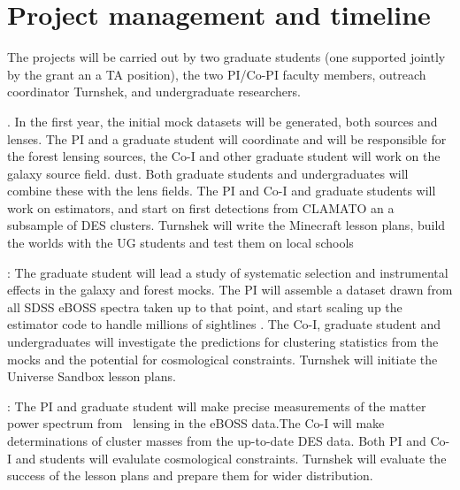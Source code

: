 \section{Project management and timeline}
The projects will be carried out by two graduate students (one
supported jointly by the grant an a TA position), 
the two PI/Co-PI faculty
members, outreach coordinator Turnshek, and undergraduate researchers.

.  In the first year, the initial mock
datasets will be generated, both sources and lenses.
The PI and a graduate student
will coordinate and will be responsible for the 
forest lensing sources, the Co-I  and other graduate student will
work on the  galaxy source field.
dust. Both graduate students and undergraduates will combine these
with the lens fields. The PI and Co-I  and graduate students will
work on estimators, and start on first detections from CLAMATO an
a subsample of DES clusters. Turnshek will write the Minecraft lesson
plans, build the worlds with the 
UG students and test them on local schools 

:
The graduate
student will lead a study of systematic selection and 
instrumental effects in the galaxy and forest
mocks. The PI will assemble a dataset drawn from
all SDSS eBOSS spectra taken up to that point, and start
scaling up the estimator code to handle millions of sightlines .
  The Co-I, graduate student and undergraduates will investigate
the predictions for clustering statistics from the mocks
and the potential for cosmological constraints. 
Turnshek will initiate the Universe Sandbox lesson plans. 

: 
The PI and graduate student will make precise measurements of
the matter power spectrum from \lya\ lensing in the eBOSS
data.The Co-I will make  determinations of cluster masses
from the up-to-date DES data. Both PI and Co-I and  students
will evalulate cosmological constraints.
Turnshek will evaluate the success of
 the lesson plans and prepare them for wider distribution.

